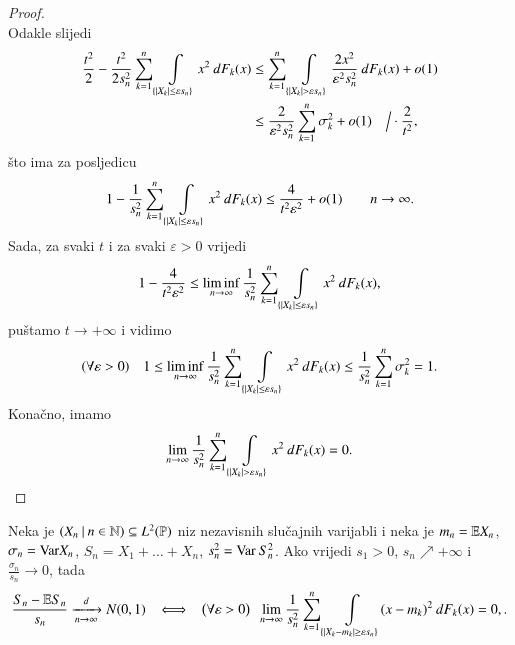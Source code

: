 \begin{proof}
\begin{equation*}
    \end{equation*}
    Odakle slijedi
    \begin{equation*}
        \begin{aligned}
            \frac{t^2}{2} - \frac{t^2}{2 s_n^2} \sum\limits_{k = 1}^{n} \int\limits_{\{ |X_k| \leq \varepsilon s_n \}} x^2 \: d F_k (x) &\leq \sum\limits_{k = 1}^{n} \int\limits_{\{ |X_k| > \varepsilon s_n \}} \frac{2 x^2}{\varepsilon^2 s_n^2} \: d F_k (x) + o(1)\\
            &\leq \frac{2}{\varepsilon^2 s_n^2} \sum\limits_{k = 1}^{n} \sigma_k^2 + o (1) \quad \Big/ \cdot \frac{2}{t^2},
        \end{aligned}
    \end{equation*}
    \v sto ima za posljedicu
    \begin{equation*}
        1 - \frac{1}{s_n^2} \sum\limits_{k = 1}^{n} \int\limits_{\{ |X_k| \leq \varepsilon s_n \}} x^2 \: d F_k (x) \leq \frac{4}{t^2 \varepsilon^2} + o(1) \quad \quad n \to \infty.
    \end{equation*}
    Sada, za svaki $t$ i za svaki $\varepsilon > 0$ vrijedi
    \begin{equation*}
        1 - \frac{4}{t^2 \varepsilon^2} \leq \liminf_{n \to \infty} \frac{1}{s_n^2} \sum\limits_{k = 1}^{n} \int\limits_{\{ |X_k| \leq \varepsilon s_n \}} x^2 \: d F_k (x),
    \end{equation*}
    pu\v stamo $t \to +\infty$ i vidimo
    \begin{equation*}
        (\forall \varepsilon > 0) \quad 1 \leq \liminf\limits_{n \to \infty} \frac{1}{s_n^2} \sum\limits_{k = 1}^{n} \int\limits_{\{ |X_k| \leq \varepsilon s_n \}} x^2 \: d F_k (x) \leq \frac{1}{s_n^2} \sum\limits_{k = 1}^{n} \sigma_k^2 = 1.
    \end{equation*}
    Kona\v cno, imamo
    \begin{equation*}
        \lim\limits_{n \to \infty} \frac{1}{s_n^2} \sum\limits_{k = 1}^{n} \int\limits_{\{ |X_k| > \varepsilon s_n \}} x^2 \: d F_k (x) = 0.
    \end{equation*}
\end{proof}

\begin{kor}  \label{kor:19.13}
    Neka je $({X_n} \: | \: {n \in \mathbb{N}}) \subseteq L^2 (\mathbb{P})$ niz nezavisnih slu\v cajnih varijabli i neka je $m_n = \mathbb{E} X_n$, $\sigma_n = \mathrm{Var} X_n$, $S_n = X_1 + \ldots + X_n$, $s_n^2 = \mathrm{Var} \: S_n^2$.
    Ako vrijedi $s_1 > 0$, $s_n \nearrow +\infty$ i $\frac{\sigma_n}{s_n} \to 0$, tada
    \begin{equation*}
        \frac{S_n - \mathbb{E} S_n}{s_n} \xrightarrow[n \to \infty]{d} N(0, 1) \; \; \iff \; \; \big( \forall \varepsilon > 0 \big) \; \; \lim\limits_{n \to \infty} \frac{1}{s_n^2} \sum\limits_{k = 1}^{n} \int\limits_{\{ |X_k - m_k| \geq \varepsilon s_n \}} (x - m_k)^2 \: d F_k (x) = 0, .
    \end{equation*}
\end{kor}

